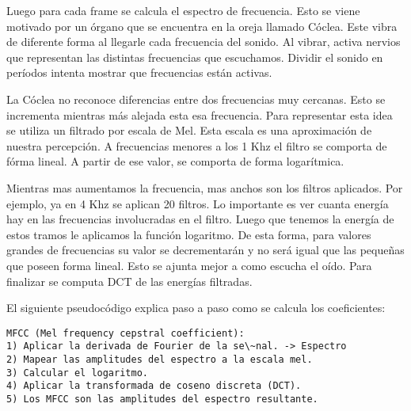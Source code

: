 Luego para cada frame se calcula el espectro de frecuencia. Esto se viene motivado por un órgano que se encuentra en la oreja llamado Cóclea. Este vibra de diferente forma al llegarle cada frecuencia del sonido. Al vibrar, activa nervios que representan las distintas frecuencias que escuchamos. Dividir el sonido en períodos intenta mostrar que frecuencias están activas.

La Cóclea no reconoce diferencias entre dos frecuencias muy cercanas. Esto se incrementa mientras más alejada esta esa frecuencia. Para representar esta idea se utiliza un filtrado por escala de Mel. Esta escala es una aproximación de nuestra percepción. A frecuencias menores a los 1 Khz el filtro se comporta de fórma lineal. A partir de ese valor, se comporta de forma logarítmica. 


Mientras mas aumentamos la frecuencia, mas anchos son los filtros aplicados. Por ejemplo, ya en 4 Khz se aplican 20 filtros. Lo importante es ver cuanta energía hay en las frecuencias involucradas en el filtro. Luego que tenemos la energía de estos tramos le aplicamos la función logaritmo. De esta forma, para valores grandes de frecuencias su valor se decrementarán y no será igual que las pequeñas que poseen forma lineal. Esto se ajunta mejor a como escucha el oído. Para finalizar se computa DCT de las energías filtradas. 

El siguiente pseudocódigo explica paso a paso como se calcula los coeficientes:
\begin{lstlisting}
MFCC (Mel frequency cepstral coefficient):
1) Aplicar la derivada de Fourier de la se\~nal. -> Espectro
2) Mapear las amplitudes del espectro a la escala mel.
3) Calcular el logaritmo.
4) Aplicar la transformada de coseno discreta (DCT).
5) Los MFCC son las amplitudes del espectro resultante.
\end{lstlisting}

